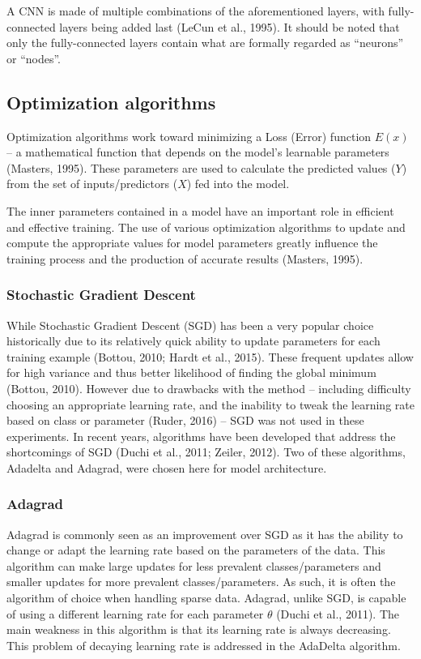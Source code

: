 \documentclass[12pt,]{article}
\begin{document}
A CNN is made of multiple combinations of the aforementioned layers,
with fully-connected layers being added last (LeCun et al., 1995). It
should be noted that only the fully-connected layers contain what are
formally regarded as ``neurons'' or ``nodes''.

\subsection{Optimization algorithms}\label{optimization-algorithms}

Optimization algorithms work toward minimizing a Loss (Error) function
\(E(x)\) -- a mathematical function that depends on the model's
learnable parameters (Masters, 1995). These parameters are used to
calculate the predicted values (\(Y\)) from the set of inputs/predictors
(\(X\)) fed into the model.

The inner parameters contained in a model have an important role in
efficient and effective training. The use of various optimization
algorithms to update and compute the appropriate values for model
parameters greatly influence the training process and the production of
accurate results (Masters, 1995).

\subsubsection{Stochastic Gradient
Descent}\label{stochastic-gradient-descent}

While Stochastic Gradient Descent (SGD) has been a very popular choice
historically due to its relatively quick ability to update parameters
for each training example (Bottou, 2010; Hardt et al., 2015). These
frequent updates allow for high variance and thus better likelihood of
finding the global minimum (Bottou, 2010). However due to drawbacks with
the method -- including difficulty choosing an appropriate learning
rate, and the inability to tweak the learning rate based on class or
parameter (Ruder, 2016) -- SGD was not used in these experiments. In
recent years, algorithms have been developed that address the
shortcomings of SGD (Duchi et al., 2011; Zeiler, 2012). Two of these
algorithms, Adadelta and Adagrad, were chosen here for model
architecture.

\subsubsection{Adagrad}\label{adagrad}

Adagrad is commonly seen as an improvement over SGD as it has the
ability to change or adapt the learning rate based on the parameters of
the data. This algorithm can make large updates for less prevalent
classes/parameters and smaller updates for more prevalent
classes/parameters. As such, it is often the algorithm of choice when
handling sparse data. Adagrad, unlike SGD, is capable of using a
different learning rate for each parameter \(\theta\) (Duchi et al.,
2011). The main weakness in this algorithm is that its learning rate is
always decreasing. This problem of decaying learning rate is addressed
in the AdaDelta algorithm.
\end{document}
